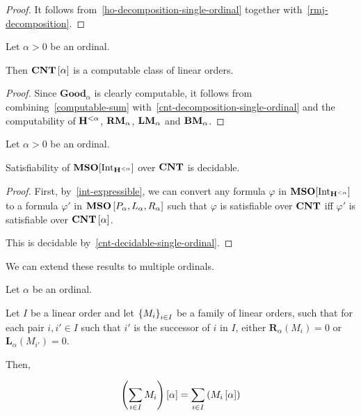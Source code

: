 \begin{proof}
  It follows from~\cref{ho-decomposition-single-ordinal}
  together with~\cref{rmj-decomposition}.
\end{proof}

\begin{lemma}\label{cnt-decidable-single-ordinal}
  Let $\alpha > 0$ be an ordinal.

  Then $\mathbf{CNT} \left[ {\alpha} \right]$ is a computable class of linear orders.
\end{lemma}

\begin{proof}
  Since $\mathbf{Good}_{\alpha}$ is clearly computable,
  it follows from combining~\cref{computable-sum}
  with~\cref{cnt-decomposition-single-ordinal}
  and the computability of $\mathbf{H}_{}^{< \alpha}$,
  $\mathbf{RM}_{\alpha}$, $\mathbf{LM}_{\alpha}$ and $\mathbf{BM}_{\alpha}$.
\end{proof}

\begin{theorem}\label{single-ordinal-satisfiability}
  Let $\alpha > 0$ be an ordinal.

  Satisfiability of $\mathbf{MSO}[\mathrm{Int}_{\mathbf{H}_{}^{< \alpha}}]$
  over $\mathbf{CNT}$ is decidable.
\end{theorem}

\begin{proof}
  First, by~\cref{int-expressible}, we can convert
  any formula $\varphi$ in $\mathbf{MSO}[\mathrm{Int}_{\mathbf{H}_{}^{< \alpha}}]$
  to a formula $\varphi'$ in $\mathbf{MSO} \left[ {P_\alpha, L_\alpha, R_\alpha} \right]$
  such that $\varphi$ is satisfiable over $\mathbf{CNT}$
  iff $\varphi'$ is satisfiable over $\mathbf{CNT} \left[ {\alpha} \right]$.

  This is decidable by~\cref{cnt-decidable-single-ordinal}.
\end{proof}

We can extend these results to multiple ordinals.

\begin{lemma}\label{extend-lemma-single-ordinal}
  Let $\alpha$ be an ordinal.

  Let $I$ be a linear order
  and let $\left\{ {M_i} \right\}_{i \in I}$ be a family of linear orders,
  such that for each pair $i, i' \in I$
  such that $i'$ is the successor of $i$ in $I$,
  either $\mathbf{R}_\alpha(M_{i}) = 0$ or $\mathbf{L}_\alpha(M_{i'}) = 0$.

  Then,

  \[
    \left( { \sum_{i \in I} M_i } \right) \left[ {\alpha} \right] = \sum_{i \in I} \left( { M_i \left[ {\alpha} \right] } \right)
  \]
\end{lemma}

